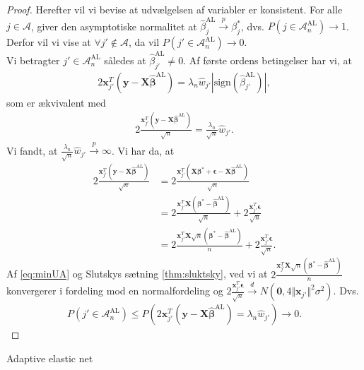 \begin{proof}
Herefter vil vi bevise at udvælgelsen af variabler er konsistent. For alle $j \in \mathcal{A}$, giver den asymptotiske normalitet at $\hat{\beta}_j^{\text{AL}} \overset{p}{\rightarrow}\beta_j^{*}$, dvs. $P(j \in \mathcal{A}_n^{\text{AL}}) \rightarrow 1$. Derfor vil vi vise at $\forall j' \notin \mathcal{A}$, da vil $P(j' \in \mathcal{A}_n^{\text{AL}}) \rightarrow 0$. \\
Vi betragter $j' \in \mathcal{A}_n^{\text{AL}}$ således at $\hat{\beta}_{j'}^{\text{AL}} \neq 0$. Af første ordens betingelser har vi, at 
\begin{align*}
2 \mathbf{x}_{j'}^T  \left( \mathbf{y}-\mathbf{X}\hat{\boldsymbol{\beta}}^{\text{AL}} \right)=\lambda_n \hat{w}_{j'} \left\vert \text{sign}(\hat{\beta}_{j'}^\text{AL}) \right\vert,
\end{align*}
som er ækvivalent med
\begin{align*}
2 \frac{\mathbf{x}_{j'}^T \left( \mathbf{y}-\mathbf{X}\hat{\boldsymbol{\beta}}^{{\text{AL}}}\right)}{\sqrt{n}}=\frac{\lambda_n}{\sqrt{n}} \hat{w}_{j'}.
\end{align*}
Vi fandt, at $\frac{\lambda_n}{\sqrt{n}} \hat{w}_{j'} \overset{p}{\rightarrow} \infty$. Vi har da, at 
\begin{align*}
2 \frac{\mathbf{x}_{j'}^T \left(\mathbf{y}-\mathbf{X}\hat{\boldsymbol{\beta}}^{{\text{AL}}} \right)}{\sqrt{n}}
 &= 2 \frac{\mathbf{x}_{j'}^T \left(\mathbf{X}\boldsymbol{\beta}^*+\boldsymbol{\epsilon}-\mathbf{X}\hat{\boldsymbol{\beta}}^{{\text{AL}}} \right) }{\sqrt{n}} \\
&= 2 \frac{\mathbf{x}_{j'}^T \mathbf{X} \left(\boldsymbol{\beta}^*-\hat{\boldsymbol{\beta}}^{\text{AL}} \right)}{\sqrt{n}}+2\frac{\mathbf{x}_{j'}^T \boldsymbol{\epsilon}}{\sqrt{n}} \\
&= 2 \frac{\mathbf{x}_{j'}^T \mathbf{X} \sqrt{n} \left(\boldsymbol{\beta}^*-\hat{\boldsymbol{\beta}}^{\text{AL}}\right)}{n}+2\frac{\mathbf{x}_{j'}^T \boldsymbol{\epsilon}}{\sqrt{n}}.
\end{align*}
Af \eqref{eq:minUA} og Slutskys sætning \ref{thm:sluktsky}, ved vi at $ 2 \frac{\mathbf{x}_{j'}^T \mathbf{X} \sqrt{n} \left(\boldsymbol{\beta}^*-\hat{\boldsymbol{\beta}}^{\text{AL}}\right)}{n}$ konvergerer i fordeling mod en normalfordeling og $2\frac{\mathbf{x}_{j'}^T \boldsymbol{\epsilon}}{\sqrt{n}} \overset{d}{\rightarrow} N \left(\mathbf{0}, 4 \Vert \mathbf{x}_{j'} \Vert^2 \sigma^2 \right)$. Dvs.
\begin{align*}
P\left(j' \in \mathcal{A}_n^{\text{AL}}\right) \leq P\left(2 \mathbf{x}_{j'}^T \left(\mathbf{y}-\mathbf{X} \hat{\boldsymbol{\beta}}^{\text{AL}}\right)=\lambda_n \hat{w}_{j'} \right) \rightarrow 0.
\end{align*}
\end{proof}


Adaptive elastic net
